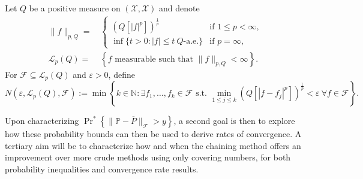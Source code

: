 \begin{definition}
\label{def--Lr-covering-number}
Let \(Q\) be a positive measure on \((\mathcal{X}, \mathscr{X})\) and denote
\begin{equation*}
  \begin{split}
    \|f\|_{p, Q} =
    & \, \begin{cases}
      \left( Q \left[ |f|^{p} \right] \right)^{\frac{1}{p}}
      & \text{if } 1 \leq
      p < \infty, \\
      \inf \{t > 0 : |f| \leq t \ Q\text{-a.e.}\}
      & \text{if } p = \infty,
    \end{cases} \\
    \mathscr{L}_{p} (Q) =
    & \, \left\{ f \text{ measurable such that }  \|f\|_{p, Q} < \infty
    \right\}.
  \end{split}
\end{equation*}
For \(\mathcal{F} \subseteq \mathscr{L}_{p} (Q)\) and \(\varepsilon > 0\),
define
\begin{equation*}
  N \left( \varepsilon, \mathscr{L}_{p} (Q), \mathcal{F} \right) := \min \left\{
  k \in \mathbb{N} : \exists f_{1}, \dots, f_{k} \in \mathcal{F} \text{ s.t. }
  \min_{1 \leq j \leq k} \left( Q \left[ \left| f - f_{j} \right|^{p} \right]
  \right)^{\frac{1}{p}} < \varepsilon \ \forall f \in \mathcal{F} \right\}.
\end{equation*}
\end{definition}

Upon characterizing \(\Pr^{\ast} \left\{ \| \mathbb{P} - \overline{P}
\|_{\mathcal{F}} > y \right\}\), a second goal is then to explore how these
probability bounds can then be used to derive rates of convergence.
A tertiary aim will be to characterize how and when the chaining method offers
an improvement over more crude methods using only covering
numbers, for both probability inequalities and convergence rate results.

